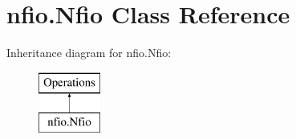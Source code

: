 \hypertarget{classnfio_1_1Nfio}{\section{nfio.\-Nfio Class Reference}
\label{classnfio_1_1Nfio}
}
Inheritance diagram for nfio.\-Nfio\-:\begin{figure}[H]
\begin{center}
\leavevmode
\includegraphics[height=2.000000cm]{classnfio_1_1Nfio}
\end{center}
\end{figure}
